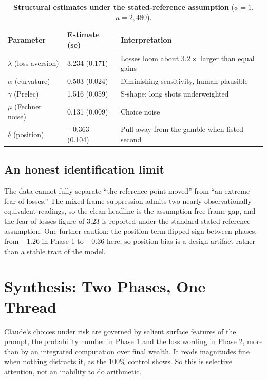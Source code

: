 \documentclass[11pt]{article}
\begin{document}
\begin{table}[h]
\centering
\small
\caption*{\small\textbf{Structural estimates under the stated-reference assumption} ($\phi = 1$,
$n = 2{,}480$).}
\begin{tabular}{@{}l l l@{}}
\toprule
\textbf{Parameter} & \textbf{Estimate (se)} & \textbf{Interpretation} \\
\midrule
$\lambda$ (loss aversion) & 3.234 (0.171)  & Losses loom about $3.2\times$ larger than equal gains \\
$\alpha$ (curvature)      & 0.503 (0.024)  & Diminishing sensitivity, human-plausible \\
$\gamma$ (Prelec)         & 1.516 (0.059)  & S-shape; long shots underweighted \\
$\mu$ (Fechner noise)     & 0.131 (0.009)  & Choice noise \\
$\delta$ (position)       & $-0.363$ (0.104) & Pull away from the gamble when listed second \\
\bottomrule
\end{tabular}
\end{table}

\subsection{An honest identification limit}
The data cannot fully separate ``the reference point moved'' from ``an extreme fear of losses.'' The
mixed-frame suppression admits two nearly observationally equivalent readings, so the clean headline is
the assumption-free frame gap, and the fear-of-losses figure of 3.23 is reported under the standard
stated-reference assumption. One further caution: the position term flipped sign between phases, from
$+1.26$ in Phase 1 to $-0.36$ here, so position bias is a design artifact rather than a stable trait
of the model.

\section{Synthesis: Two Phases, One Thread}

\begin{synthcard}
Claude's choices under risk are governed by salient surface features of the prompt, the probability
number in Phase 1 and the loss wording in Phase 2, more than by an integrated computation over final
wealth. It reads magnitudes fine when nothing distracts it, as the 100\% control shows. So this is
selective attention, not an inability to do arithmetic.
\end{synthcard}
\end{document}
